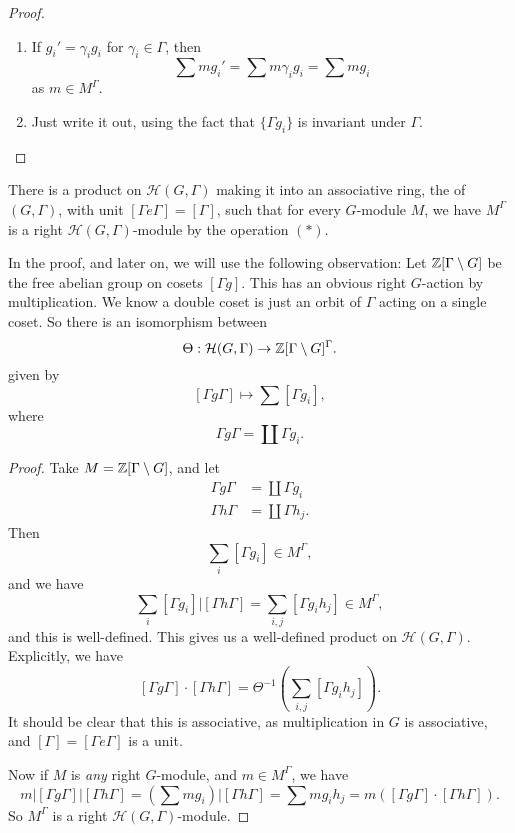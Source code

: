 \documentclass[a4paper]{article}
\begin{document}
\begin{proof}\leavevmode
  \begin{enumerate}
    \item If $g_i' = \gamma_i g_i$ for $\gamma_i \in \Gamma$, then
      \[
        \sum m g_i' = \sum m \gamma_i g_i = \sum m g_i
      \]
      as $m \in M^\Gamma$.
    \item Just write it out, using the fact that $\{\Gamma g_i\}$ is invariant under $\Gamma$.\qedhere
  \end{enumerate}
\end{proof}

\begin{thm}
  There is a product on $\mathcal{H}(G, \Gamma)$ making it into an associative ring, the  of $(G, \Gamma)$, with unit $[\Gamma e \Gamma] = [\Gamma]$, such that for every $G$-module $M$, we have $M^\Gamma$ is a right $\mathcal{H}(G, \Gamma)$-module by the operation $(*)$.
\end{thm}

In the proof, and later on, we will use the following observation: Let $\mathbb{Z}[\Gamma\setminus G]$ be the free abelian group on cosets $[\Gamma g]$. This has an obvious right $G$-action by multiplication. We know a double coset is just an orbit of $\Gamma$ acting on a single coset. So there is an isomorphism between
\[
  \Theta: \mathcal{H}(G, \Gamma) \to \mathbb{Z}[\Gamma \setminus G]^\Gamma.
\]
given by
\[
  [\Gamma g \Gamma] \mapsto \sum [\Gamma g_i],
\]
where
\[
  \Gamma g \Gamma = \coprod \Gamma g_i.
\]
\begin{proof}
  Take $M = \mathbb{Z}[\Gamma \setminus G]$, and let
  \begin{align*}
    \Gamma g \Gamma &= \coprod \Gamma g_i\\
    \Gamma h \Gamma &= \coprod \Gamma h_j.
  \end{align*}
  Then
  \[
    \sum_i [\Gamma g_i] \in M^\Gamma,
  \]
  and we have
  \[
    \sum_i [\Gamma g_i] | [\Gamma h \Gamma] = \sum_{i, j} [\Gamma g_i h_j] \in M^\Gamma,
  \]
  and this is well-defined. This gives us a well-defined product on $\mathcal{H}(G, \Gamma)$. Explicitly, we have
  \[
    [\Gamma g \Gamma] \cdot [\Gamma h \Gamma] = \Theta^{-1}\left(\sum_{i, j} [\Gamma g_i h_j]\right).
  \]
  It should be clear that this is associative, as multiplication in $G$ is associative, and $[\Gamma] = [\Gamma e \Gamma]$ is a unit.

  Now if $M$ is \emph{any} right $G$-module, and $m \in M^\Gamma$, we have
  \[
    m|[\Gamma g \Gamma] | [\Gamma h \Gamma] = \left(\sum m g_i\right)|[\Gamma h \Gamma] = \sum m g_i h_j = m ([\Gamma g \Gamma] \cdot [\Gamma h \Gamma]).
  \]
  So $M^\Gamma$ is a right $\mathcal{H}(G, \Gamma)$-module.
\end{proof}
\end{document}
